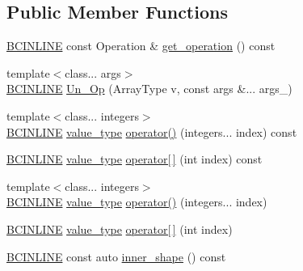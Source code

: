 \subsection*{Public Member Functions}
\begin{DoxyCompactItemize}
\item 
\hyperlink{common_8h_a6699e8b0449da5c0fafb878e59c1d4b1}{B\+C\+I\+N\+L\+I\+NE} const Operation \& \hyperlink{structbc_1_1tensors_1_1exprs_1_1Un__Op_a756b6657d522f931f4379c62e3d4b523}{get\+\_\+operation} () const
\item 
{\footnotesize template$<$class... args$>$ }\\\hyperlink{common_8h_a6699e8b0449da5c0fafb878e59c1d4b1}{B\+C\+I\+N\+L\+I\+NE} \hyperlink{structbc_1_1tensors_1_1exprs_1_1Un__Op_a85fa628d6bfe8068582f86b04e99b910}{Un\+\_\+\+Op} (Array\+Type v, const args \&... args\+\_\+)
\item 
{\footnotesize template$<$class... integers$>$ }\\\hyperlink{common_8h_a6699e8b0449da5c0fafb878e59c1d4b1}{B\+C\+I\+N\+L\+I\+NE} \hyperlink{structbc_1_1tensors_1_1exprs_1_1Un__Op_a8c87b36ec972937cd789e6517fb47369}{value\+\_\+type} \hyperlink{structbc_1_1tensors_1_1exprs_1_1Un__Op_a7c9d055f60de762c1b5e2eb46f1603f2}{operator()} (integers... index) const
\item 
\hyperlink{common_8h_a6699e8b0449da5c0fafb878e59c1d4b1}{B\+C\+I\+N\+L\+I\+NE} \hyperlink{structbc_1_1tensors_1_1exprs_1_1Un__Op_a8c87b36ec972937cd789e6517fb47369}{value\+\_\+type} \hyperlink{structbc_1_1tensors_1_1exprs_1_1Un__Op_a02a8c8bff37fe164c4e79079fc00a621}{operator\mbox{[}$\,$\mbox{]}} (int index) const
\item 
{\footnotesize template$<$class... integers$>$ }\\\hyperlink{common_8h_a6699e8b0449da5c0fafb878e59c1d4b1}{B\+C\+I\+N\+L\+I\+NE} \hyperlink{structbc_1_1tensors_1_1exprs_1_1Un__Op_a8c87b36ec972937cd789e6517fb47369}{value\+\_\+type} \hyperlink{structbc_1_1tensors_1_1exprs_1_1Un__Op_a23addbb1769304e2004f15abd506108f}{operator()} (integers... index)
\item 
\hyperlink{common_8h_a6699e8b0449da5c0fafb878e59c1d4b1}{B\+C\+I\+N\+L\+I\+NE} \hyperlink{structbc_1_1tensors_1_1exprs_1_1Un__Op_a8c87b36ec972937cd789e6517fb47369}{value\+\_\+type} \hyperlink{structbc_1_1tensors_1_1exprs_1_1Un__Op_a684b195d190de12ca47d69a03c03a4c1}{operator\mbox{[}$\,$\mbox{]}} (int index)
\item 
\hyperlink{common_8h_a6699e8b0449da5c0fafb878e59c1d4b1}{B\+C\+I\+N\+L\+I\+NE} const auto \hyperlink{structbc_1_1tensors_1_1exprs_1_1Un__Op_a2996b6b2e5f266f7323fe43b524c9a64}{inner\+\_\+shape} () const

\end{DoxyCompactItemize}
